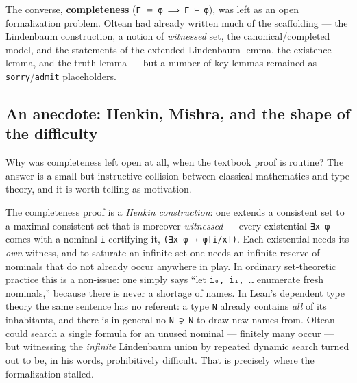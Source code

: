 \documentclass[11pt,a4paper]{article}
\renewcommand{\_}{\origtextunderscore\allowbreak}
\begin{document}
The converse, \textbf{completeness} (\texttt{Γ\ ⊨\ φ\ ⟹\ Γ\ ⊢\ φ}), was left as an open formalization problem. Oltean had already written much of the scaffolding --- the Lindenbaum construction, a notion of \emph{witnessed} set, the canonical/completed model, and the statements of the extended Lindenbaum lemma, the existence lemma, and the truth lemma --- but a number of key lemmas remained as \texttt{sorry}/\texttt{admit} placeholders.

\hypertarget{an-anecdote-henkin-mishra-and-the-shape-of-the-difficulty}{%
\subsection{An anecdote: Henkin, Mishra, and the shape of the difficulty}\label{an-anecdote-henkin-mishra-and-the-shape-of-the-difficulty}}

Why was completeness left open at all, when the textbook proof is routine? The answer is a small but instructive collision between classical mathematics and type theory, and it is worth telling as motivation.

The completeness proof is a \emph{Henkin construction}: one extends a consistent set to a maximal consistent set that is moreover \emph{witnessed} --- every existential \texttt{∃x\ φ} comes with a nominal \texttt{i} certifying it, \texttt{(∃x\ φ\ →\ φ{[}i/x{]})}. Each existential needs its \emph{own} witness, and to saturate an infinite set one needs an infinite reserve of nominals that do not already occur anywhere in play. In ordinary set-theoretic practice this is a non-issue: one simply says ``let \texttt{i₀,\ i₁,\ …} enumerate fresh nominals,'' because there is never a shortage of names. In Lean's dependent type theory the same sentence has no referent: a type \texttt{N} already contains \emph{all} of its inhabitants, and there is in general no \texttt{N\textquotesingle{}\ ⊋\ N} to draw new names from. Oltean could search a single formula for an unused nominal --- finitely many occur --- but witnessing the \emph{infinite} Lindenbaum union by repeated dynamic search turned out to be, in his words, prohibitively difficult. That is precisely where the formalization stalled.
\end{document}
